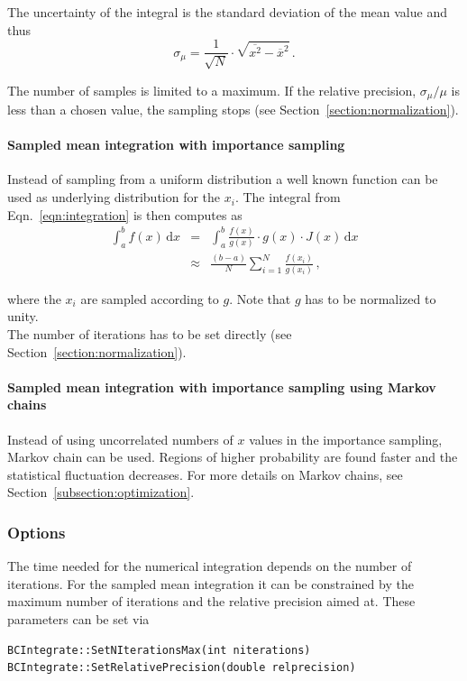 \documentclass[11pt, a4paper]{article}
\begin{document}
\noindent 
The uncertainty of the integral is the standard deviation of the mean
value and thus 
%
\begin{equation}
\sigma_{\mu} = \frac{1}{\sqrt{N}} \cdot \sqrt{\overline{x^{2}} - \overline{x}^{2}} \, . 
\end{equation} 

\noindent 
The number of samples is limited to a maximum. If the relative
precision, $\sigma_{\mu}/\mu$ is less than a chosen value, the
sampling stops (see Section~\ref{section:normalization}). 

\paragraph{Sampled mean integration with importance sampling} 

Instead of sampling from a uniform distribution a well known function
can be used as underlying distribution for the $x_{i}$. The integral
from Eqn.~\ref{eqn:integration} is then computes as 
%
\begin{eqnarray}
\int_{a}^{b} f(x) \, \mathrm{d}x & = & \int_{a}^{b} \frac{f(x)}{g(x)} \cdot g(x) \cdot J(x) \, \mathrm{d}x \\ 
 & \approx & \frac{(b - a)}{N} \sum_{i=1}^{N} \frac{f(x_{i})}{g(x_{i})} \, , 
\end{eqnarray} 

\noindent 
where the $x_{i}$ are sampled according to $g$. Note that $g$ has to
be normalized to unity. \\ 

\noindent 
The number of iterations has to be set directly (see Section~\ref{section:normalization}). 

\paragraph{Sampled mean integration with importance sampling using Markov chains} 

Instead of using uncorrelated numbers of $x$ values in the importance
sampling, Markov chain can be used. Regions of higher probability are
found faster and the statistical fluctuation decreases. For more
details on Markov chains, see Section~\ref{subsection:optimization}.

\subsubsection{Options}

The time needed for the numerical integration depends on the number of
iterations. For the sampled mean integration it can be constrained by
the maximum number of iterations and the relative precision aimed
at. These parameters can be set via
%
\begin{verbatim}
BCIntegrate::SetNIterationsMax(int niterations)
BCIntegrate::SetRelativePrecision(double relprecision) 
\end{verbatim} 
\end{document}
